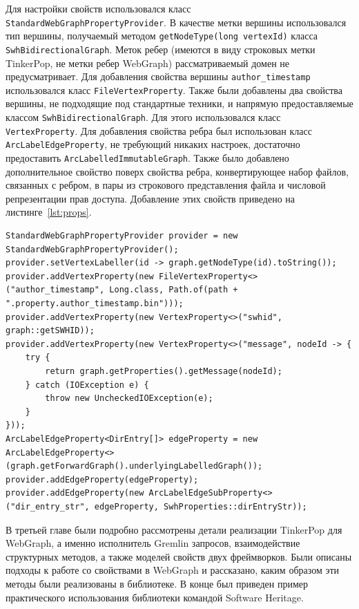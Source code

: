 \documentclass[times,specification,annotation]{itmo-student-thesis}
\begin{document}
Для настройки свойств использовался класс \texttt{StandardWebGraphPropertyProvider}. В качестве метки вершины использовался тип вершины, получаемый методом \texttt{getNodeType(long vertexId)} класса \texttt{SwhBidirectionalGraph}. Меток ребер (имеются в виду строковых метки TinkerPop, не метки ребер WebGraph) рассматриваемый домен не предусматривает. Для добавления свойства вершины \texttt{author\_timestamp} использовался класс \texttt{FileVertexProperty}. Также были добавлены два свойства вершины, не подходящие под стандартные техники, и напрямую предоставляемые классом \texttt{SwhBidirectionalGraph}. Для этого использовался класс \texttt{VertexProperty}.
Для добавления свойства ребра был использован класс \texttt{ArcLabelEdgeProperty}, не требующий никаких настроек, достаточно предоставить \texttt{ArcLabelledImmutableGraph}. Также было добавлено дополнительное свойство поверх свойства ребра, конвертирующее набор файлов, связанных с ребром, в пары из строкового представления файла и числовой репрезентации прав доступа. Добавление этих свойств приведено на листинге~\ref{lst:props}.

\begin{lstlisting}[float=!h,caption={Добавление свойств для графа Software Heritage},label={lst:props}]
StandardWebGraphPropertyProvider provider = new StandardWebGraphPropertyProvider();
provider.setVertexLabeller(id -> graph.getNodeType(id).toString());
provider.addVertexProperty(new FileVertexProperty<>("author_timestamp", Long.class, Path.of(path + ".property.author_timestamp.bin")));
provider.addVertexProperty(new VertexProperty<>("swhid", graph::getSWHID));
provider.addVertexProperty(new VertexProperty<>("message", nodeId -> {
    try {
        return graph.getProperties().getMessage(nodeId);
    } catch (IOException e) {
        throw new UncheckedIOException(e);
    }
}));
ArcLabelEdgeProperty<DirEntry[]> edgeProperty = new ArcLabelEdgeProperty<>(graph.getForwardGraph().underlyingLabelledGraph());
provider.addEdgeProperty(edgeProperty);
provider.addEdgeProperty(new ArcLabelEdgeSubProperty<>("dir_entry_str", edgeProperty, SwhProperties::dirEntryStr));
\end{lstlisting}

\chapterconclusion

В третьей главе были подробно рассмотрены детали реализации TinkerPop для WebGraph, а именно исполнитель Gremlin запросов, взаимодействие структурных методов, а также моделей свойств двух фреймворков. Были описаны подходы к работе со свойствами в WebGraph и рассказано, каким образом эти методы были реализованы в библиотеке. В конце был приведен пример практического использования библиотеки командой Software Heritage.
\end{document}
